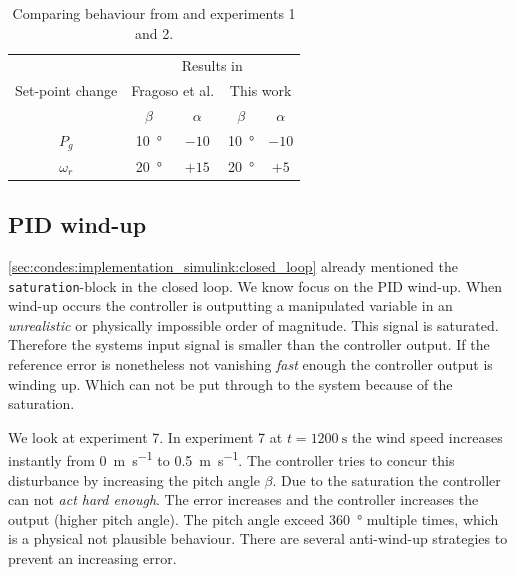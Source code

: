 \begin{table}[H]
    \caption{Comparing behaviour from \cite{Fragoso_et_al_2017} and experiments 1 and 2.}
    \centering
    \begin{tabular}{ccccc} \toprule
        & \multicolumn{4}{c}{Results in } \\
        Set-point change & \multicolumn{2}{c}{Fragoso et al.} & \multicolumn{2}{c}{This work} \\
        & $\beta$ & $\alpha$& $\beta$ & $\alpha$ \\ \midrule
        $P_g$ & \SI[retain-explicit-plus]{+10}{\degree} & $-10$ & \SI[retain-explicit-plus]{+10}{\degree} & $-10$ \\
        $\omega_r$ & \SI[retain-explicit-plus]{+20}{\degree} & $+15$ & \SI[retain-explicit-plus]{+20}{\degree}& $+5$\\ \bottomrule
    \end{tabular}
    \label{tab:condes:results:benchmark_changes}
\end{table}


\subsection{PID wind-up}

\autoref{sec:condes:implementation_simulink:closed_loop} already mentioned the \texttt{saturation}-block in the closed loop.
We know focus on the PID wind-up.
When wind-up occurs the controller is outputting a manipulated variable in an \textit{unrealistic} or physically impossible order of magnitude.
This signal is saturated.
Therefore the systems input signal is smaller than the controller output.
If the reference error is nonetheless not vanishing \textit{fast} enough the controller output is winding up.
Which can not be put through to the system because of the saturation.

We look at experiment 7.
In experiment 7 at $t=\SI{1200}{\second}$ the wind speed increases instantly from \SI{0}{\metre\per\second} to \SI{0.5}{\metre\per\second}.
The controller tries to concur this disturbance by increasing the pitch angle $\beta$.
Due to the saturation the controller can not \textit{act hard enough}.
The error increases and the controller increases the output (higher pitch angle).
The pitch angle exceed \SI{360}{\degree} multiple times, which is a physical not plausible behaviour.
There are several anti-wind-up strategies to prevent an increasing error.

